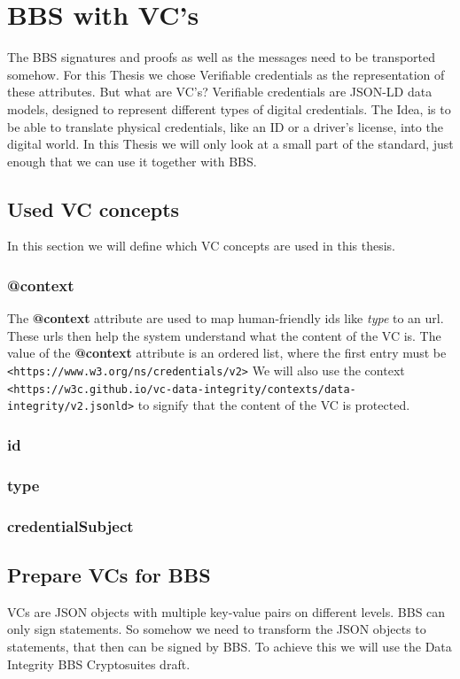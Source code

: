 \documentclass[
	a4paper               %
	,bibliography=totoc   %
	,listof=totoc         %
	,monolingual
	twoside=false,
]{bfhthesis}              %
\begin{document}
\section{BBS with VC's}
The BBS signatures and proofs as well as the messages need to be transported somehow.
For this Thesis we chose Verifiable credentials \cite{verifiable-credentials} as the representation of these attributes.
But what are VC's? \newline
Verifiable credentials are JSON-LD data models, designed to represent different types of digital credentials.
The Idea, is to be able to translate physical credentials, like an ID or a driver's license, into the digital world.
In this Thesis we will only look at a small part of the standard, just enough that we can use it together with BBS.

\subsection{Used VC concepts}
In this section we will define which VC concepts are used in this thesis.

\subsubsection{@context}
The \textbf{@context} attribute are used to map human-friendly ids like \textit{type} to an url.
These urls then help the system understand what the content of the VC is.
The value of the \textbf{@context} attribute is an ordered list, where the first entry must be \verb|<https://www.w3.org/ns/credentials/v2>|
We will also use the context \verb|<https://w3c.github.io/vc-data-integrity/contexts/data-integrity/v2.jsonld>| to signify that the content of the VC is protected.

\subsubsection{id}


\subsubsection{type}

\subsubsection{credentialSubject}


\subsection{Prepare VCs for BBS}
VCs are JSON objects with multiple key-value pairs on different levels.
BBS can only sign statements.
So somehow we need to transform the JSON objects to statements, that then can be signed by BBS.
To achieve this we will use the Data Integrity BBS Cryptosuites draft\cite{bbsvc}.
\end{document}
